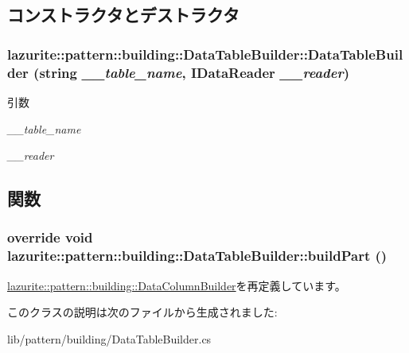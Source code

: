 \subsection{コンストラクタとデストラクタ}
\hypertarget{classlazurite_1_1pattern_1_1building_1_1_data_table_builder_a2eb9658dec8881dd6fe6d8985cf80ed4}{
\subsubsection[{DataTableBuilder}]{\setlength{\rightskip}{0pt plus 5cm}lazurite::pattern::building::DataTableBuilder::DataTableBuilder (string {\em \_\-\_\-table\_\-name}, \/  IDataReader {\em \_\-\_\-reader})}}
\label{classlazurite_1_1pattern_1_1building_1_1_data_table_builder_a2eb9658dec8881dd6fe6d8985cf80ed4}

\begin{DoxyParams}{引数}
\item[{\em \_\-\_\-table\_\-name}]\item[{\em \_\-\_\-reader}]\end{DoxyParams}


\subsection{関数}
\hypertarget{classlazurite_1_1pattern_1_1building_1_1_data_table_builder_a7854fcd46057380db161064c8dc6ce82}{
\subsubsection[{buildPart}]{\setlength{\rightskip}{0pt plus 5cm}override void lazurite::pattern::building::DataTableBuilder::buildPart ()}}
\label{classlazurite_1_1pattern_1_1building_1_1_data_table_builder_a7854fcd46057380db161064c8dc6ce82}


\hyperlink{classlazurite_1_1pattern_1_1building_1_1_data_column_builder_a9f5d113f7c726c0ce117255ca6a6b776}{lazurite::pattern::building::DataColumnBuilder}を再定義しています。

このクラスの説明は次のファイルから生成されました:\begin{DoxyCompactItemize}
\item 
lib/pattern/building/DataTableBuilder.cs\end{DoxyCompactItemize}
